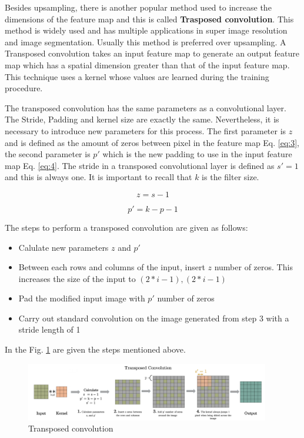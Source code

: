 \documentclass{article}
\begin{document}
Besides upsampling, there is another popular method used to increase the dimensions of the feature map and this is called \textbf{Trasposed convolution}. This method is widely used and has multiple applications in super image resolution and image segmentation. Usually this method is preferred over upsampling. A Transposed convolution takes an input feature map to generate an output feature map which has a spatial dimension greater than that of the input feature map. This technique uses a kernel whose values are learned during the training procedure.

The transposed convolution has the same parameters as a convolutional layer. The Stride, Padding and kernel size are exactly the same. Nevertheless, it is necessary to introduce new parameters for this process. The first parameter is \(z\) and is defined as the amount of zeros between pixel in the feature map Eq. \eqref{eq:3}, the second parameter is \(p'\) which is the new padding to use in the input feature map Eq. \eqref{eq:4}. The stride in a transposed convolutional layer is defined as \(s' = 1\) and this is always one. It is important to recall that \(k\) is the filter size.

\begin{equation}
z = s - 1
\label{eq:3}
\end{equation}

\begin{equation}
p' = k - p - 1
\label{eq:4}
\end{equation}

The steps to perform a transposed convolution are given as follows:

\begin{itemize}
  \item Calulate new parameters \(z\) and \(p'\)
  \item Between each rows and columns of the input, insert \(z\) number of zeros. This increases the size of the input to \((2*i-1),(2*i-1)\)
  \item Pad the modified input image with \(p'\) number of zeros
  \item Carry out standard convolution on the image generated from step 3 with a stride length of 1
\end{itemize}

In the Fig. \ref{fig:f7} are given the steps mentioned above. 

\begin{figure}[ht]
    \centering
    \includegraphics[width=0.95\textwidth,height=0.95\textheight,keepaspectratio]{images/transposed_conv.png}
    \captionsetup{justification=centering}
    \caption{Transposed convolution}
    \label{fig:f7}
\end{figure}
\end{document}
